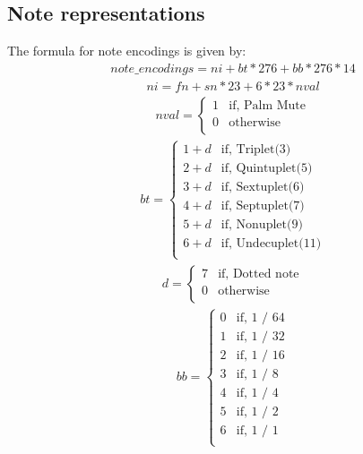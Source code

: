 \documentclass[twoside,11pt]{article}
\begin{document}
\subsection{Note representations}
\label{sec:note-representations}
The formula for note encodings is given by: 
\begin{align}
note\_encodings = ni + bt * 276 + bb * 276 * 14
\end{align}
\begin{align}
ni = fn + sn * 23 + 6 * 23 * nval
\end{align}
\begin{align}
nval =
\begin{cases}
1& \text{if, Palm Mute} \\
0 & \text{otherwise} \\
\end{cases}
\end{align}
\begin{align}
bt =
\begin{cases}
1 + d & \text{if, Triplet(3)} \\
2 + d & \text{if, Quintuplet(5)} \\
3 + d & \text{if, Sextuplet(6)} \\
4  + d& \text{if, Septuplet(7)} \\
5 + d & \text{if, Nonuplet(9)} \\
6 + d & \text{if, Undecuplet(11)}\\
\end{cases}
\end{align}
\begin{align}
d =
\begin{cases}
7& \text{if, Dotted note} \\
0 & \text{otherwise} \\
\end{cases}
\end{align}
\begin{align}
bb =
\begin{cases}
0 & \text{if, 1 / 64} \\
1 & \text{if, 1 / 32} \\
2 & \text{if, 1 / 16} \\
3 & \text{if, 1 / 8} \\
4 & \text{if, 1 / 4} \\
5 & \text{if, 1 / 2} \\
6 & \text{if, 1 / 1} \\
\end{cases}
\end{align}
\end{document}
